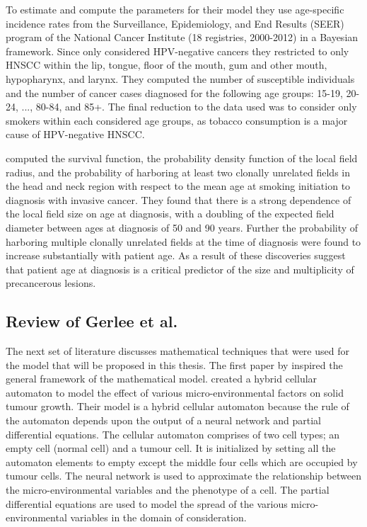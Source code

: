 \documentclass[\main/thesis.tex]{subfiles}
\begin{document}
To estimate and compute the parameters for their model they use age-specific incidence rates from the Surveillance, Epidemiology, and End Results (SEER) program of the National Cancer Institute (18 registries, 2000-2012) in a Bayesian framework. Since \textcite{Ryser} only considered HPV-negative cancers they restricted to only HNSCC within the lip, tongue, floor of the mouth, gum and other mouth, hypopharynx, and larynx. They computed the number of susceptible individuals and the number of cancer cases diagnosed for the following age groups: 15-19, 20-24, ..., 80-84, and 85+. The final reduction to the data used was to consider only smokers within each considered age groups, as tobacco consumption is a major cause of HPV-negative HNSCC. 

\textcite{Ryser} computed the survival function, the probability density function of the local field radius, and the probability of harboring at least two clonally unrelated fields in the head and neck region with respect to the mean age at smoking initiation to diagnosis with invasive cancer. They found that there is a strong dependence of the local field size on age at diagnosis, with a doubling of the expected field diameter between ages at diagnosis of 50 and 90 years. Further the probability of harboring multiple clonally unrelated fields at the time of diagnosis were found to increase substantially with patient age. As a result of these discoveries \textcite{Ryser} suggest that patient age at diagnosis is a critical predictor of the size and multiplicity of precancerous lesions. 

\subsection{Review of Gerlee et al.}
The next set of literature discusses mathematical techniques that were used for the model that will be proposed in this thesis. The first paper by \textcite{Gerlee} inspired the general framework of the mathematical model. \textcite{Gerlee} created a hybrid cellular automaton to model the effect of various micro-environmental factors on solid tumour growth. Their model is a hybrid cellular automaton because the rule of the automaton depends upon the output of a neural network and partial differential equations. The cellular automaton comprises of two cell types; an empty cell (normal cell) and a tumour cell. It is initialized by setting all the automaton elements to empty except the middle four cells which are occupied by tumour cells. The neural network is used to approximate the relationship between the micro-environmental variables and the phenotype of a cell. The partial differential equations are used to model the spread of the various micro-environmental variables in the domain of consideration. 
\end{document}
